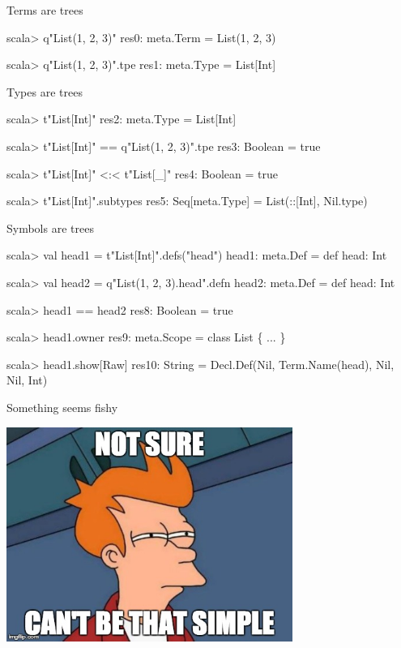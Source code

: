 \documentclass[svgnames,dvipsnames,hyperref={bookmarks=false},usepdftitle=false]{beamer}
\begin{document}
\begin{frame}[fragile]{Terms are trees}
\begin{semiverbatim}
scala> q"List(1, 2, 3)"
res0: meta.Term = List(1, 2, 3)

scala> q"List(1, 2, 3)".tpe
res1: meta.Type = List[Int]
\end{semiverbatim}
\end{frame}

\begin{frame}[fragile]{Types are trees}
\begin{semiverbatim}
scala> t"List[Int]"
res2: meta.Type = List[Int]

scala> t"List[Int]" == q"List(1, 2, 3)".tpe
res3: Boolean = true

scala> t"List[Int]" <:< t"List[_]"
res4: Boolean = true

scala> t"List[Int]".subtypes
res5: Seq[meta.Type] = List(::[Int], Nil.type)
\end{semiverbatim}
\end{frame}

\begin{frame}[fragile]{Symbols are trees}
\begin{semiverbatim}
scala> val head1 = t"List[Int]".defs("head")
head1: meta.Def = def head: Int

scala> val head2 = q"List(1, 2, 3).head".defn
head2: meta.Def = def head: Int

scala> head1 == head2
res8: Boolean = true

scala> head1.owner
res9: meta.Scope = class List \{ ... \}

scala> head1.show[Raw]
res10: String = Decl.Def(Nil, Term.Name(head), Nil, Nil, Int)
\end{semiverbatim}
\end{frame}

\begin{frame}[c, fragile]{Something seems fishy}
\begin{center}
\includegraphics[height=7cm]{notsure.jpg}
\end{center}
\end{frame}
\end{document}
